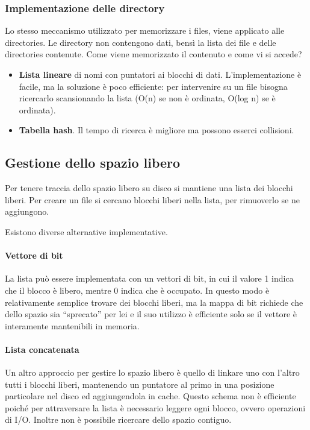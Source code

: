 \documentclass[a4paper]{article}
\begin{document}
\subsubsection{Implementazione delle directory}
Lo stesso meccanismo utilizzato per memorizzare i files, viene applicato alle directories. Le directory non contengono dati, bensì la lista dei file e delle directories contenute. Come viene memorizzato il contenuto e come vi si accede?
\begin{itemize}
    \item \textbf{Lista lineare} di nomi con puntatori ai blocchi di dati. L'implementazione è facile, ma la soluzione è poco efficiente: per intervenire su un file bisogna ricercarlo scansionando la lista (O(n) se non è ordinata, O(log n) se è ordinata).
    \item \textbf{Tabella hash}. Il tempo di ricerca è migliore ma possono esserci collisioni.
\end{itemize}

\subsection{Gestione dello spazio libero}

Per tenere traccia dello spazio libero su disco si mantiene una lista dei blocchi liberi. Per creare un file si cercano blocchi liberi nella lista, per rimuoverlo se ne aggiungono.

Esistono diverse alternative implementative.

\paragraph{Vettore di bit}
La lista può essere implementata con un vettori di bit, in cui il valore 1 indica che il blocco è libero, mentre 0 indica che è occupato. In questo modo è relativamente semplice trovare dei blocchi liberi, ma la mappa di bit richiede che dello spazio sia ``sprecato'' per lei e il suo utilizzo è efficiente solo se il vettore è interamente mantenibili in memoria.

\paragraph{Lista concatenata}
Un altro approccio per gestire lo spazio libero è quello di linkare uno con l'altro tutti i blocchi liberi, mantenendo un puntatore al primo in una posizione particolare nel disco ed aggiungendola in cache. Questo schema non è efficiente poiché per attraversare la lista è necessario leggere ogni blocco, ovvero operazioni di I/O. Inoltre non è possibile ricercare dello spazio contiguo.
\end{document}

